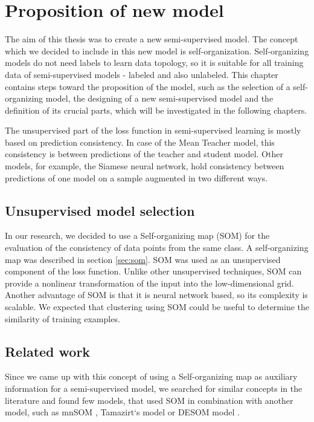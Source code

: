 \chapter{Proposition of new model}

\label{chap:research}

The aim of this thesis was to create a new semi-supervised model. The concept which we decided to include in this new model is self-organization. Self-organizing models do not need labels to learn data topology, so it is suitable for all training data of semi-supervised models - labeled and also unlabeled. This chapter contains steps toward the proposition of the model, such as the selection of a self-organizing model, the designing of a new semi-supervised model and the definition of its crucial parts, which will be investigated in the following chapters.

The unsupervised part of the loss function in semi-supervised learning is mostly based on prediction consistency. In case of the Mean Teacher model, this consistency is between predictions of the teacher and student model. Other models, for example, the Siamese neural network, hold consistency between predictions of one model on a sample augmented in two different ways.

\section{Unsupervised model selection}
In our research, we decided to use a Self-organizing map (SOM)\cite{kohonen1990} for the evaluation of the consistency of data points from the same class. A self-organizing map was described in section \ref{sec:som}. SOM was used as an unsupervised component of the loss function. Unlike other unsupervised techniques, SOM can provide a nonlinear transformation of the input into the low-dimensional grid. Another advantage of SOM is that it is neural network based, so its complexity is scalable. We expected that clustering using SOM could be useful to determine the similarity of training examples.


\section{Related work}
Since we came up with this concept of using a Self-organizing map as auxiliary information for a semi-supervised model, we searched for similar concepts in the literature and found few models, that used SOM in combination with another model, such as mnSOM \cite{Tokunaga}, Tamazirt`s model \cite{Tamazirt} or DESOM model \cite{desom2019}.

